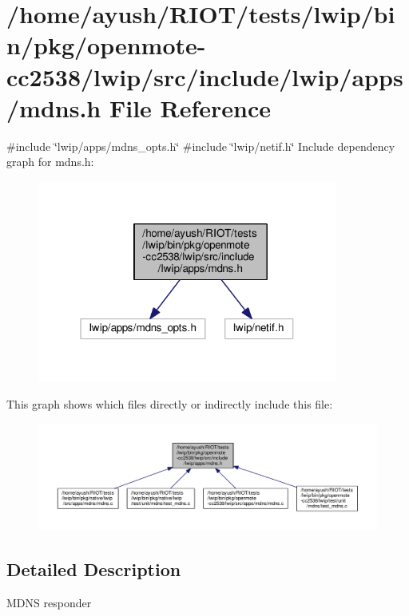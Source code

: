 \hypertarget{openmote-cc2538_2lwip_2src_2include_2lwip_2apps_2mdns_8h}{}\section{/home/ayush/\+R\+I\+O\+T/tests/lwip/bin/pkg/openmote-\/cc2538/lwip/src/include/lwip/apps/mdns.h File Reference}
\label{openmote-cc2538_2lwip_2src_2include_2lwip_2apps_2mdns_8h}
{\ttfamily \#include \char`\"{}lwip/apps/mdns\+\_\+opts.\+h\char`\"{}}\newline
{\ttfamily \#include \char`\"{}lwip/netif.\+h\char`\"{}}\newline
Include dependency graph for mdns.\+h\+:
\nopagebreak
\begin{figure}[H]
\begin{center}
\leavevmode
\includegraphics[width=280pt]{openmote-cc2538_2lwip_2src_2include_2lwip_2apps_2mdns_8h__incl}
\end{center}
\end{figure}
This graph shows which files directly or indirectly include this file\+:
\nopagebreak
\begin{figure}[H]
\begin{center}
\leavevmode
\includegraphics[width=350pt]{openmote-cc2538_2lwip_2src_2include_2lwip_2apps_2mdns_8h__dep__incl}
\end{center}
\end{figure}


\subsection{Detailed Description}
M\+D\+NS responder 